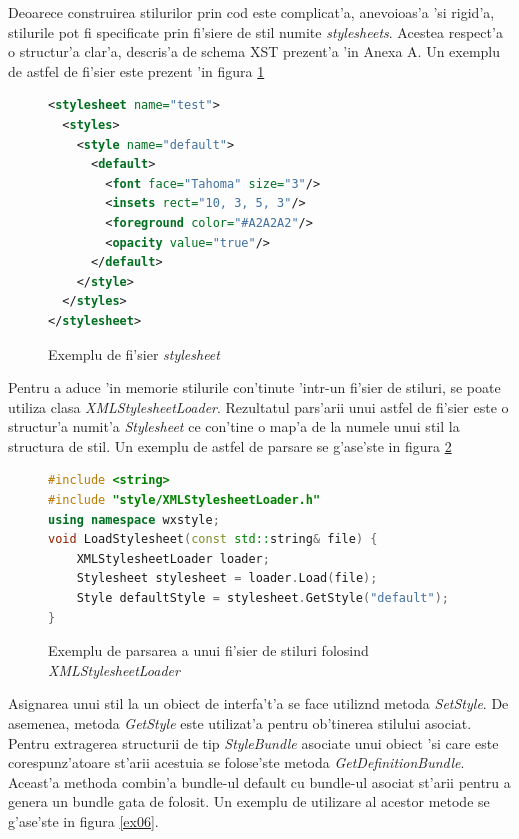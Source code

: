 \medskip

Deoarece construirea stilurilor prin cod este complicat'a, anevoioas'a 'si rigid'a, stilurile pot fi specificate prin fi'siere de stil numite \emph{stylesheets}. Acestea respect'a o structur'a clar'a, descris'a de schema XST prezent'a 'in Anexa A. Un exemplu de astfel de fi'sier este prezent 'in figura \ref{ex04}

\begin{figure}[H]
\begin{lstlisting}[language=XML]
<stylesheet name="test">
  <styles>
    <style name="default">
	  <default>
	    <font face="Tahoma" size="3"/>
		<insets rect="10, 3, 5, 3"/>
		<foreground color="#A2A2A2"/>
		<opacity value="true"/>
	  </default>
	</style>
  </styles>
</stylesheet>
\end{lstlisting}
\caption{Exemplu de fi'sier \emph{stylesheet}}
\label{ex04}
\end{figure}

Pentru a aduce 'in memorie stilurile con'tinute 'intr-un fi'sier de stiluri, se poate utiliza clasa \emph{XMLStylesheetLoader}. Rezultatul pars'arii unui astfel de fi'sier este o structur'a numit'a \emph{Stylesheet} ce con'tine o map'a de la numele unui stil la structura de stil. Un exemplu de astfel de parsare se g'ase'ste in figura \ref{ex05}

\begin{figure}[H]
\begin{lstlisting}[language=C++]
#include <string>
#include "style/XMLStylesheetLoader.h"
using namespace wxstyle;
void LoadStylesheet(const std::string& file) {
	XMLStylesheetLoader loader;
	Stylesheet stylesheet = loader.Load(file);
	Style defaultStyle = stylesheet.GetStyle("default");
}
\end{lstlisting}
\caption{Exemplu de parsarea a unui fi'sier de stiluri folosind \emph{XMLStylesheetLoader}}
\label{ex05}
\end{figure}

Asignarea unui stil la un obiect de interfa't'a se face utiliz{\ia}nd metoda \emph{SetStyle}. De asemenea, metoda \emph{GetStyle} este utilizat'a pentru ob'tinerea stilului asociat. Pentru extragerea structurii de tip \emph{StyleBundle} asociate unui obiect 'si care este corespunz'atoare st'arii acestuia se folose'ste metoda \emph{GetDefinitionBundle}. Aceast'a methoda combin'a bundle-ul default cu bundle-ul asociat st'arii pentru a genera un bundle gata de folosit. Un exemplu de utilizare al acestor metode se g'ase'ste in figura \ref{ex06}.

